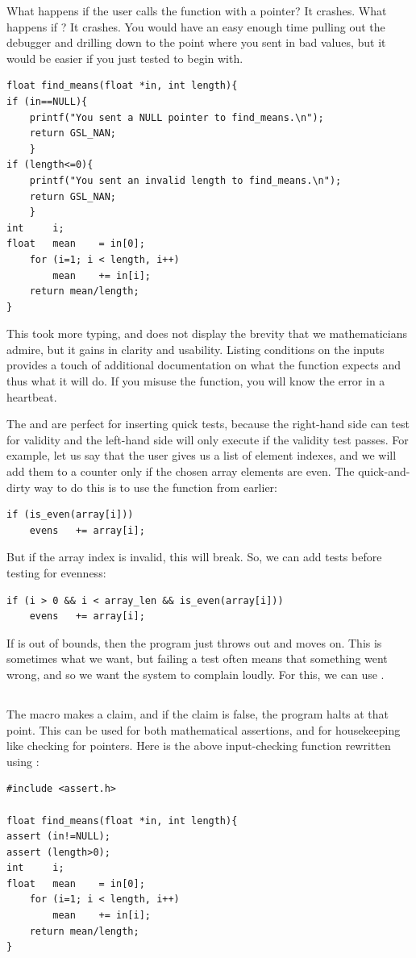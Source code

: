 What happens if the user calls the function with a 
pointer? It crashes. What happens if ? It crashes.
You would have an easy enough time pulling out the debugger and drilling
down to the point where you sent in bad values, but it would be easier
if you just tested to begin with.
\begin{lstlisting}
float find_means(float *in, int length){
if (in==NULL){
    printf("You sent a NULL pointer to find_means.\n");
    return GSL_NAN;
    }
if (length<=0){
    printf("You sent an invalid length to find_means.\n");
    return GSL_NAN;
    }
int     i;
float   mean    = in[0];
    for (i=1; i < length, i++)
        mean    += in[i];
    return mean/length;
}
\end{lstlisting}
This took more typing, and does not display the brevity that we
mathematicians admire, but it gains in clarity and usability. Listing
conditions on the inputs provides a touch of additional documentation on
what the function expects and thus what it will do. If you misuse the
function, you will know the error in a heartbeat.

The \ci{\&\&} and \ci{||} are perfect for inserting quick tests,
because the right-hand side can test for validity and the left-hand
side will only execute if the validity test passes. For example, 
let us say that the user gives us a list of element indexes, and we will
add them to a counter only if the chosen array elements are even. The
quick-and-dirty way to do this is to use the  function
from earlier:
\begin{lstlisting}
if (is_even(array[i]))
    evens   += array[i];
\end{lstlisting}
But if the array index is invalid, this will break. So, we can add tests
before testing for evenness:
\begin{lstlisting}
if (i > 0 && i < array_len && is_even(array[i]))
    evens   += array[i];
\end{lstlisting}
If  is out of bounds, then the program just throws  out and 
moves on. This is sometimes what we want, but failing a test often means
that something went wrong, and so we want the system to complain loudly.
For this, we can use .

\subsection{} 
The  macro makes a claim, and if the claim is false, the
program halts at that point. This can be used for both mathematical
assertions, and for housekeeping like checking for 
pointers. Here is the above input-checking function rewritten using
:
\begin{lstlisting}
#include <assert.h>

float find_means(float *in, int length){
assert (in!=NULL);
assert (length>0);
int     i;
float   mean    = in[0];
    for (i=1; i < length, i++)
        mean    += in[i];
    return mean/length;
}
\end{lstlisting}

